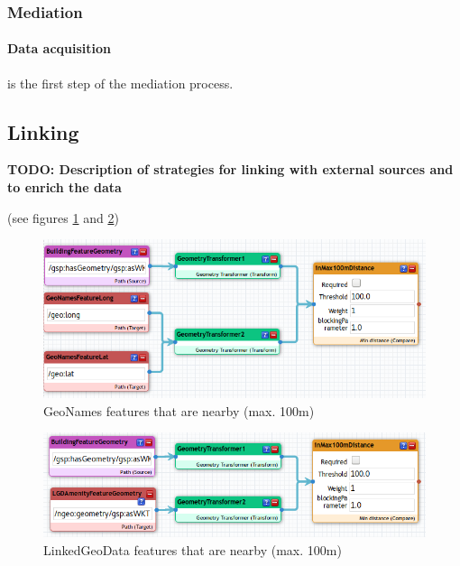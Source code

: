 \documentclass[draft,final]{vutinfth} %
\newcommand{\todo}[1]{{\color{red}\textbf{TODO: {#1}}}} %
\begin{document}
\subsubsection{Mediation}

\paragraph{Data acquisition} is the first step of the mediation process. 


\subsection{Linking}
\label{solution-architectural-prototype:linking}
\todo{Description of strategies for linking with external sources and to enrich the data}

(see figures \ref{fig:solution-architectural-prototype:ld-management:linking:gnNearBy} and \ref{fig:solution-architectural-prototype:ld-management:linking:lgdNearBy})

\begin{figure}[h]
    \centering
    \includegraphics[width=1.0\textwidth]{graphics/linking/geonamesFeatureNearByLinking.png}
    \caption{GeoNames features that are nearby (max. 100m)}
    \label{fig:solution-architectural-prototype:ld-management:linking:gnNearBy}
\end{figure}

\begin{figure}[h]
    \centering
    \includegraphics[width=1.0\textwidth]{graphics/linking/linkedgeodataAmenityNearBy.png}
    \caption{LinkedGeoData features that are nearby (max. 100m)}
    \label{fig:solution-architectural-prototype:ld-management:linking:lgdNearBy}
\end{figure}
\end{document}
